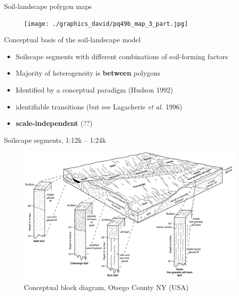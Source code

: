 \documentclass[aspectratio=169]{beamer}
\begin{document}
\begin{frame}{Soil-landscape polygon maps}
\begin{figure}
    \centering    \texttt{[image: ./graphics\_david/pq49b\_map\_3\_part.jpg]}
\end{figure}  
\end{frame}

\begin{frame}{Conceptual basis of the soil-landscape model}
    \begin{itemize}
        \item Soilscape segments with different combinations of soil-forming factors
        \item Majority of heterogeneity is \textbf{between} polygons
        \item Identified by a conceptual paradigm (Hudson 1992)
        \item identifiable transitions (but see Lagacherie \textit{et al.} 1996)
        \item \textbf{scale-independent} (??)
    \end{itemize}
\end{frame}

\begin{frame}{Soilscape segments, 1:12k -- 1:24k}
    \begin{figure}
        \centering
\includegraphics[height=0.65\textheight]{./graphics_david/NY-2010-09-28-14.pdf}\\
{Conceptual block diagram, Otsego County NY (USA)}
     \end{figure}
\end{frame}
\end{document}
